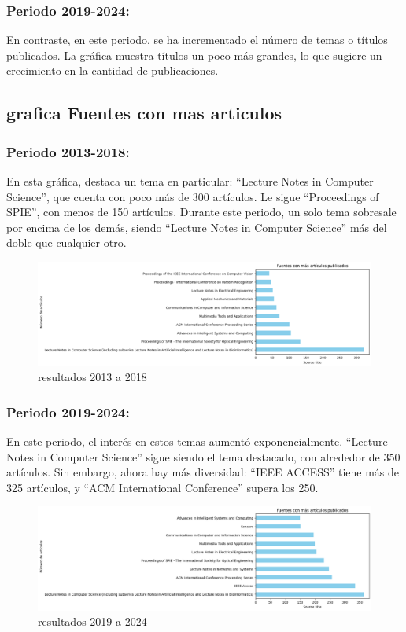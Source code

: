 \documentclass[conference]{IEEEtran}
\begin{document}
\subsubsection{Periodo 2019-2024:}
En contraste, en este periodo, se ha incrementado el número de temas o títulos publicados.
La gráfica muestra títulos un poco más grandes, lo que sugiere un crecimiento en la cantidad de publicaciones.


\subsection{grafica Fuentes con mas articulos}
\subsubsection{Periodo 2013-2018:}
En esta gráfica, destaca un tema en particular: “Lecture Notes in Computer Science”, que cuenta con poco más de 300 artículos.
Le sigue “Proceedings of SPIE”, con menos de 150 artículos.
Durante este periodo, un solo tema sobresale por encima de los demás, siendo “Lecture Notes in Computer Science” más del doble que cualquier otro.
\begin{figure}[H]
    \centering
    \includegraphics[width=1\linewidth]{fuentes2013.png}
    \caption{resultados 2013 a 2018}
    \label{fig:enter-label}
\end{figure}


\subsubsection{Periodo 2019-2024:}
En este periodo, el interés en estos temas aumentó exponencialmente.
“Lecture Notes in Computer Science” sigue siendo el tema destacado, con alrededor de 350 artículos.
Sin embargo, ahora hay más diversidad: “IEEE ACCESS” tiene más de 325 artículos, y “ACM International Conference” supera los 250.

\begin{figure}[H]
    \centering
    \includegraphics[width=1\linewidth]{fuentes2019.png}
    \caption{resultados 2019 a 2024}
    \label{fig:enter-label}
\end{figure}
\end{document}
